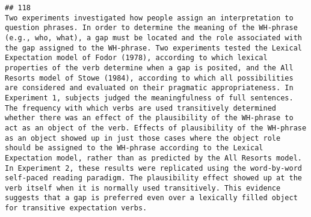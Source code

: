 \documentclass[
  english,
  man]{apa6}
\begin{document}
\begin{verbatim}
## 118                                                                                                                                                                                                                                                                                                                                                                                                                                                                                                                                                                                                                                                                                                                                                                                                                                                                                                                                                                                                                                                                                                                                                                                                                                                                                                    Two experiments investigated how people assign an interpretation to question phrases. In order to determine the meaning of the WH-phrase (e.g., who, what), a gap must be located and the role associated with the gap assigned to the WH-phrase. Two experiments tested the Lexical Expectation model of Fodor (1978), according to which lexical properties of the verb determine when a gap is posited, and the All Resorts model of Stowe (1984), according to which all possibilities are considered and evaluated on their pragmatic appropriateness. In Experiment 1, subjects judged the meaningfulness of full sentences. The frequency with which verbs are used transitively determined whether there was an effect of the plausibility of the WH-phrase to act as an object of the verb. Effects of plausibility of the WH-phrase as an object showed up in just those cases where the object role should be assigned to the WH-phrase according to the Lexical Expectation model, rather than as predicted by the All Resorts model. In Experiment 2, these results were replicated using the word-by-word self-paced reading paradigm. The plausibility effect showed up at the verb itself when it is normally used transitively. This evidence suggests that a gap is preferred even over a lexically filled object for transitive expectation verbs.

\end{verbatim}
\end{document}
